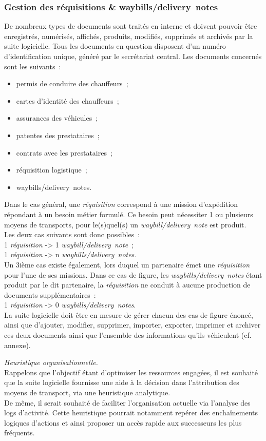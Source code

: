 \subsubsection{Gestion des réquisitions \& waybills/delivery~notes}
De nombreux types de documents sont traités en interne et doivent pouvoir être enregistrés, numérisés, affichés, produits, modifiés, supprimés et archivés par la suite logicielle. Tous les documents en question disposent d'un numéro d'identification unique, généré par le secrétariat central. Les documents concernés sont les suivants~:
\begin{itemize}
	\item permis de conduire des chauffeurs~;
	\item cartes d'identité des chauffeurs~;
	\item assurances des véhicules~;
	\item patentes des prestataires~;
	\item contrats avec les prestataires~;
	\item réquisition logistique~;
	\item waybills/delivery~notes.
\end{itemize}
Dans le cas général, une \emph{réquisition} correspond à une mission d'expédition répondant à un besoin métier formulé. Ce besoin peut nécessiter 1 ou plusieurs moyens de transports, pour le(s)quel(s) un \emph{waybill/delivery~note} est produit.
\\
Les deux cas suivants sont donc possibles~:
\\
1 \emph{réquisition} -> 1 \emph{waybill/delivery~note}~;
\\
1 \emph{réquisition} -> n \emph{waybills/delivery~notes}.
\\
Un 3ième cas existe également, lors duquel un partenaire émet une \emph{réquisition} pour l'une de ses missions. Dans ce cas de figure, les \emph{waybills/delivery~notes} étant produit par le dit partenaire, la \emph{réquisition} ne conduit à aucune production de documents supplémentaires~:
\\
1 \emph{réquisition} -> 0 \emph{waybills/delivery~notes}.
\\
La suite logicielle doit être en mesure de gérer chacun des cas de figure énoncé, ainsi que d'ajouter, modifier, supprimer, importer, exporter, imprimer et archiver ces deux documents ainsi que l'ensemble des informations qu'ils véhiculent (cf. annexe).
\begin{notation}
\emph{Heuristique organisationnelle.}
\\
Rappelons que l'objectif étant d'optimiser les ressources engagées, il est souhaité que la suite logicielle fournisse une aide à la décision dans l'attribution des moyens de transport, via une heuristique analytique.
\\
De même, il serait souhaité de faciliter l'organisation actuelle via l'analyse des logs d'activité. Cette heuristique pourrait notamment repérer des enchaînements logiques d'actions et ainsi proposer un accès rapide aux successeurs les plus fréquents.
\end{notation}

